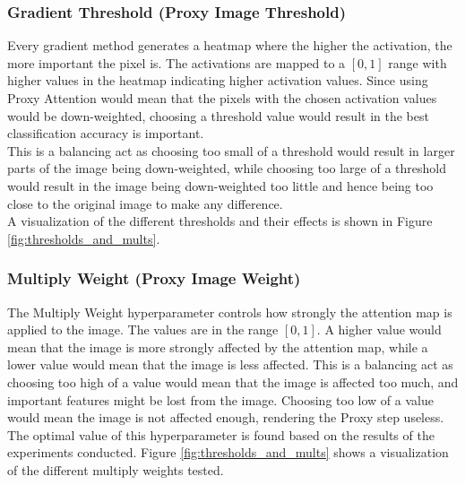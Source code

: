 \documentclass[a4paper,11pt,openright]{book}
\begin{document}
\subsubsection{Gradient Threshold (Proxy Image Threshold)} \label{sec:grad_threshold}
Every gradient method generates a heatmap where the higher the activation, the more important the pixel is. The activations are mapped to a $[0,1]$ range with higher values in the heatmap indicating higher activation values. Since using Proxy Attention would mean that the pixels with the chosen activation values would be down-weighted, choosing a threshold value would result in the best classification accuracy is important.\\
This is a balancing act as choosing too small of a threshold would result in larger parts of the image being down-weighted, while choosing too large of a threshold would result in the image being down-weighted too little and hence being too close to the original image to make any difference.\\
A visualization of the different thresholds and their effects is shown in Figure \ref{fig:thresholds_and_mults}.

\subsubsection{Multiply Weight (Proxy Image Weight)} \label{sec:mult_weight}
The Multiply Weight hyperparameter controls how strongly the attention map is applied to the image. The values are in the range $[0,1]$. A higher value would mean that the image is more strongly affected by the attention map, while a lower value would mean that the image is less affected. This is a balancing act as choosing too high of a value would mean that the image is affected too much, and important features might be lost from the image. Choosing too low of a value would mean the image is not affected enough, rendering the Proxy step useless. The optimal value of this hyperparameter is found based on the results of the experiments conducted. Figure \ref{fig:thresholds_and_mults} shows a visualization of the different multiply weights tested.
\end{document}
